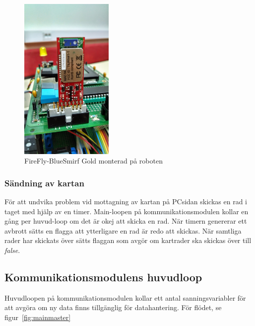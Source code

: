 \documentclass[a4paper,12pt,fleqn]{article}
\begin{document}
\begin{figure}[htp] %
  \begin{center}
  \includegraphics[keepaspectratio=true,width=0.4\textwidth]{bilder/robotbilder/Firefly.jpg}  %
  \end{center}
  \caption{FireFly-BlueSmirf Gold monterad på roboten} %
  \label{fig:firefly}
\end{figure}


\subsubsection{Sändning av kartan}
För att undvika problem vid mottagning av kartan på PCsidan skickas en rad i taget med hjälp av en timer. Main-loopen på kommunikationsmodulen kollar en gång per huvud-loop om det är okej att skicka en rad. När timern genererar ett avbrott sätts en flagga att ytterligare en rad är redo att skickas. När samtliga rader har skickats över sätts flaggan som avgör om kartrader ska skickas över till \emph{false}.
\newpage

\subsection{Kommunikationsmodulens huvudloop}

Huvudloopen på kommunikationsmodulen kollar ett antal sanningsvariabler för att avgöra om ny data finns tillgänglig för datahantering. För flödet, se figur~\ref{fig:mainmaster}
\end{document}
